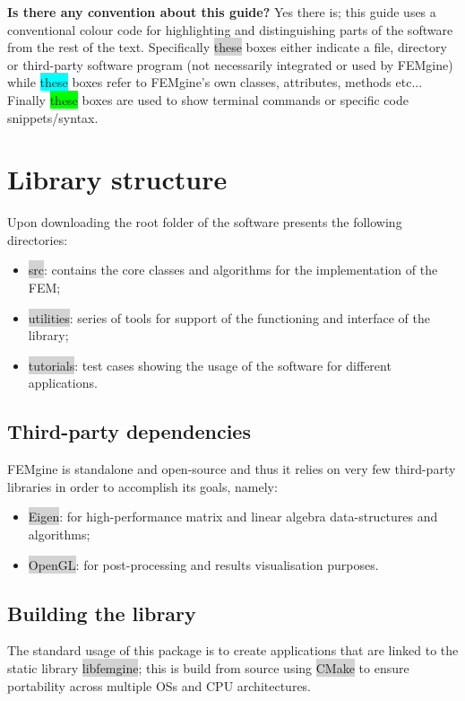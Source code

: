 \documentclass[11pt]{article}
\begin{document}
\newline
\newline
\noindent
\textbf{Is there any convention about this guide?} Yes there is; this guide uses a conventional colour code for highlighting and distinguishing parts of the software from the rest of the text. Specifically \colorbox{lightgray}{these} boxes either indicate a file, directory or third-party software program (not necessarily integrated or used by FEMgine) while \colorbox{cyan}{these} boxes refer to FEMgine's own classes, attributes, methods etc... Finally \colorbox{lime}{these} boxes are used to show terminal commands or specific code snippets/syntax.

\tableofcontents

\section{Library structure}
\noindent
Upon downloading the root folder of the software presents the following directories:
\begin{itemize}
    \item \colorbox{lightgray}{src}: contains the core classes and algorithms for the implementation of the FEM;
    \item \colorbox{lightgray}{utilities}: series of tools for support of the functioning and interface of the library;
    \item \colorbox{lightgray}{tutorials}: test cases showing the usage of the software for different applications.
\end{itemize}

\subsection{Third-party dependencies}
FEMgine is standalone and open-source and thus it relies on very few third-party libraries in order to accomplish its goals, namely:
\begin{itemize}
    \item \colorbox{lightgray}{Eigen}: for high-performance matrix and linear algebra data-structures and algorithms;
    \item \colorbox{lightgray}{OpenGL}: for post-processing and results visualisation purposes.
\end{itemize}

\subsection{Building the library}
The standard usage of this package is to create applications that are linked to the static library \colorbox{lightgray}{libfemgine}; this is build from source using \colorbox{lightgray}{CMake} to ensure portability across multiple OSs and CPU architectures.
\end{document}
